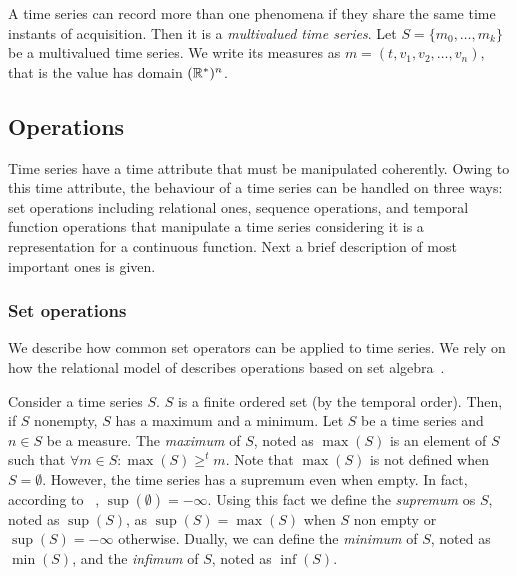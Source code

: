 A time series can record more than one phenomena if they share the
same time instants of acquisition. Then it is a \emph{multivalued time
  series}. Let $S = \{m_0, \ldots, m_k\}$ be a multivalued time
series. We write its measures as $m=(t,v_1,v_2,\ldots,v_n)$, that is
the value has domain $(\mathbb{R}^{*})^n$.




\subsection{Operations}
\label{sec:model:operations}

Time series have a time attribute that must be manipulated
coherently. Owing to this time attribute, the behaviour of a time
series can be handled on three ways:  set operations including
relational ones,  sequence operations, and  temporal function
operations that manipulate a time series considering it is a
representation for a continuous function. Next a brief description of
most important ones is given.




\subsubsection{Set operations}

We describe how common set operators can be applied to time series. We
rely on how the relational model of  describes operations
based on set algebra~\cite{date:introduction}.


Consider a time series $S$. $S$ is a finite ordered set (by the
temporal order). Then, if $S$ nonempty, $S$ has a maximum and a
minimum.  
%
Let $S$ be a time series and $n\in S$ be a measure. The \emph{maximum}
of $S$, noted as $\max(S)$ is an element of $S$ such that $\forall m
\in S:\max(S)\geq^t m $.  
%
Note that $\max(S)$ is not defined when $S=\emptyset$. However, the
time series has a supremum even when empty. In fact, according to~
\cite{cantrell:extendedreal}, $\sup(\emptyset)=-\infty$.
%
Using this fact we define the \emph{supremum} os $S$, noted as
$\sup(S)$, as $\sup(S)=\max(S)$ when $S$ non empty or
$\sup(S)=-\infty$ otherwise.
%
Dually, we can define the \emph{minimum} of $S$, noted as $\min(S)$,
and the \emph{infimum} of $S$, noted as $\inf(S)$.

